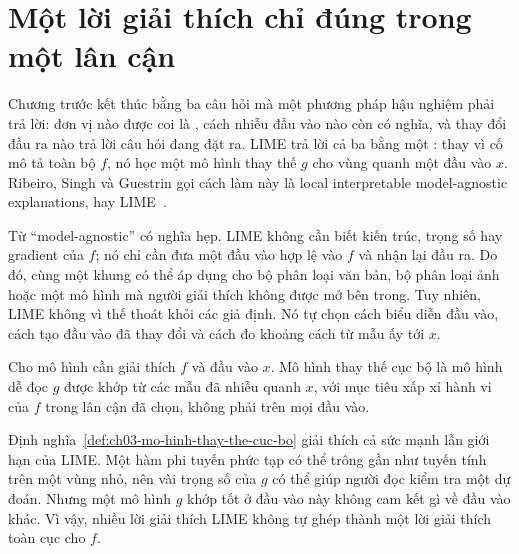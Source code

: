\section{Một lời giải thích chỉ đúng trong một lân cận}
\label{sec:ch03-mot-loi-giai-thich-cuc-bo}

%
%
Chương trước kết thúc bằng ba câu hỏi mà một phương pháp hậu nghiệm phải trả
lời: đơn vị nào được coi là , cách nhiễu đầu vào nào
còn có nghĩa, và
thay đổi đầu ra nào trả lời câu hỏi đang đặt ra. LIME trả lời cả ba bằng một
: thay vì cố
mô tả toàn bộ $f$, nó học một mô hình thay thế $g$ cho vùng quanh một đầu vào
$x$. Ribeiro, Singh và Guestrin gọi cách làm này là local interpretable
model-agnostic explanations, hay LIME~\autocite{p09lime}.

Từ \enquote{model-agnostic} có nghĩa hẹp. LIME không cần biết kiến trúc, trọng số
hay gradient của $f$; nó chỉ cần đưa một đầu vào hợp lệ vào $f$ và nhận lại đầu
ra. Do đó, cùng một khung có thể áp dụng cho bộ phân loại văn bản, bộ phân loại
ảnh hoặc một mô hình mà người giải thích không được mở bên trong. Tuy nhiên,
LIME không vì thế thoát khỏi các giả định. Nó tự chọn cách biểu diễn đầu vào,
cách tạo đầu vào đã thay đổi và cách đo khoảng cách từ mẫu ấy tới $x$.

\begin{definition}
\label{def:ch03-mo-hinh-thay-the-cuc-bo}
Cho mô hình cần giải thích $f$ và đầu vào $x$. Mô hình thay thế cục bộ là
mô hình dễ đọc $g$ được khớp từ các mẫu đã nhiễu quanh $x$, với mục tiêu
xấp xỉ hành vi của $f$ trong lân cận đã chọn, không phải trên mọi đầu vào.
\end{definition}

Định nghĩa~\ref{def:ch03-mo-hinh-thay-the-cuc-bo} giải thích cả sức mạnh lẫn
giới hạn của LIME. Một hàm phi tuyến phức tạp có thể trông gần như tuyến tính
trên một vùng nhỏ, nên vài trọng số của $g$ có thể giúp người đọc kiểm tra một
dự đoán. Nhưng một mô hình $g$ khớp tốt ở đầu vào này không cam kết gì về đầu
vào khác. Vì vậy, nhiều lời giải thích LIME không tự ghép thành một lời giải
thích toàn cục cho $f$.

